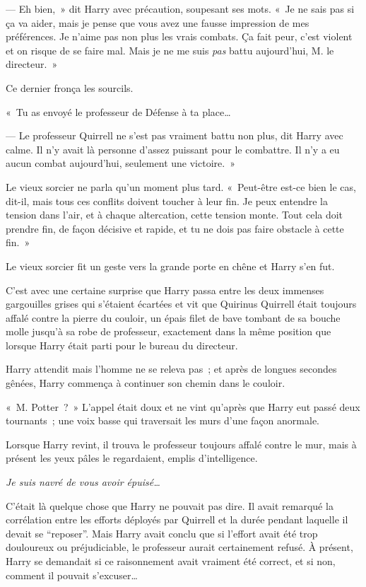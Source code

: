 --- Eh bien,~» dit Harry avec précaution, soupesant ses mots. «~Je ne sais pas si ça va aider, mais je pense que vous avez une fausse impression de mes préférences. Je n'aime pas non plus les vrais combats. Ça fait peur, c'est violent et on risque de se faire mal. Mais je ne me suis \emph{pas} battu aujourd'hui, M. le directeur.~»

Ce dernier fronça les sourcils.

«~Tu as envoyé le professeur de Défense à ta place…

--- Le professeur Quirrell ne s'est pas vraiment battu non plus, dit Harry avec calme. Il n'y avait là personne d'assez puissant pour le combattre. Il n'y a eu aucun combat aujourd'hui, seulement une victoire.~»

Le vieux sorcier ne parla qu'un moment plus tard. «~Peut-être est-ce bien le cas, dit-il, mais tous ces conflits doivent toucher à leur fin. Je peux entendre la tension dans l'air, et à chaque altercation, cette tension monte. Tout cela doit prendre fin, de façon décisive et rapide, et tu ne dois pas faire obstacle à cette fin.~»

Le vieux sorcier fit un geste vers la grande porte en chêne et Harry s'en fut.

\later

C'est avec une certaine surprise que Harry passa entre les deux immenses gargouilles grises qui s'étaient écartées et vit que Quirinus Quirrell était toujours affalé contre la pierre du couloir, un épais filet de bave tombant de sa bouche molle jusqu'à sa robe de professeur, exactement dans la même position que lorsque Harry était parti pour le bureau du directeur.

Harry attendit mais l'homme ne se releva pas~; et après de longues secondes gênées, Harry commença à continuer son chemin dans le couloir.

«~M. Potter~?~» L'appel était doux et ne vint qu'après que Harry eut passé deux tournants~; une voix basse qui traversait les murs d'une façon anormale.

Lorsque Harry revint, il trouva le professeur toujours affalé contre le mur, mais à présent les yeux pâles le regardaient, emplis d'intelligence.

\emph{Je suis navré de vous avoir épuisé…}

C'était là quelque chose que Harry ne pouvait pas dire. Il avait remarqué la corrélation entre les efforts déployés par Quirrell et la durée pendant laquelle il devait se “reposer”. Mais Harry avait conclu que si l'effort avait été trop douloureux ou préjudiciable, le professeur aurait certainement refusé. À présent, Harry se demandait si ce raisonnement avait vraiment été correct, et si non, comment il pouvait s'excuser…

